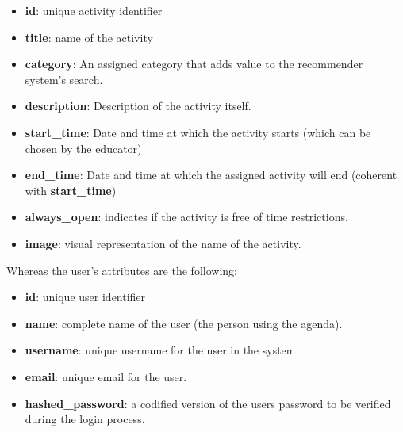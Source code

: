 \documentclass[10pt,twocolumn,letterpaper]{article}
\begin{document}
\begin{itemize}

    \item \textbf{id}: unique activity identifier

    \item \textbf{title}: name of the activity

    \item \textbf{category}: An assigned category that adds value to the recommender system's search.

    \item \textbf{description}: Description of the activity itself.

    \item \textbf{start\_time}: Date and time at which the activity starts (which can be chosen by the educator)

    \item \textbf{end\_time}: Date and time at which the assigned activity will end (coherent with \textbf{start\_time})

    \item \textbf{always\_open}: indicates if the activity is free of time restrictions.

    \item \textbf{image}: visual representation of the name of the activity.
    
\end{itemize}

Whereas the user's attributes are the following:

\begin{itemize}

    \item \textbf{id}: unique user identifier

    \item \textbf{name}: complete name of the user (the person using the agenda).

    \item \textbf{username}: unique username for the user in the system.

    \item \textbf{email}: unique email for the user.

    \item \textbf{hashed\_password}: a codified version of the users password to be verified during the login process.
    
\end{itemize}


\end{document}
